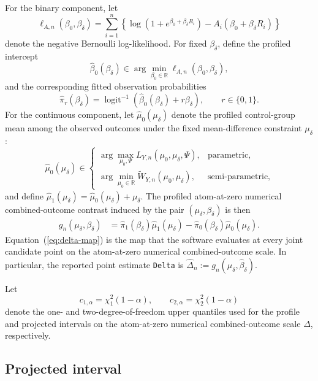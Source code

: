 \documentclass[11pt]{article}
\begin{document}
For the binary component, let
\[
  \ell_{A,n}(\beta_0,\beta_\delta)
  =
  \sum_{i = 1}^n
  \left\{
    \log\left(1 + e^{\beta_0 + \beta_\delta R_i}\right)
    - A_i(\beta_0 + \beta_\delta R_i)
  \right\}
\]
denote the negative Bernoulli log-likelihood. For fixed $\beta_\delta$, define the profiled intercept
\[
  \widehat{\beta}_0(\beta_\delta)
  \in
  \arg\min_{\beta_0 \in \mathbb{R}} \ell_{A,n}(\beta_0,\beta_\delta),
\]
and the corresponding fitted observation probabilities
\[
  \widehat{\pi}_r(\beta_\delta)
  =
  \operatorname{logit}^{-1}\!\left(\widehat{\beta}_0(\beta_\delta) + r\beta_\delta\right),
  \qquad r \in \{0,1\}.
\]
For the continuous component, let $\widehat{\mu}_0(\mu_\delta)$ denote the profiled control-group mean among the observed outcomes under the fixed mean-difference constraint $\mu_\delta$:
\[
  \widehat{\mu}_0(\mu_\delta)
  \in
  \begin{cases}
    \arg\max\limits_{\mu_0,\Psi} L_{Y,n}(\mu_0,\mu_\delta,\Psi), & \text{parametric},\\[0.8em]
    \arg\min\limits_{\mu_0 \in \mathbb{R}} \widetilde{W}_{Y,n}(\mu_0,\mu_\delta), & \text{semi-parametric},
  \end{cases}
\]
and define $\widehat{\mu}_1(\mu_\delta) = \widehat{\mu}_0(\mu_\delta) + \mu_\delta$. The profiled atom-at-zero numerical combined-outcome contrast induced by the pair $(\mu_\delta,\beta_\delta)$ is then
\begin{align}
  g_n(\mu_\delta,\beta_\delta)
  &=
  \widehat{\pi}_1(\beta_\delta)\widehat{\mu}_1(\mu_\delta)
  -
  \widehat{\pi}_0(\beta_\delta)\widehat{\mu}_0(\mu_\delta).
  \label{eq:delta-map}
\end{align}
Equation~(\ref{eq:delta-map}) is the map that the software evaluates at every joint candidate point on the atom-at-zero numerical combined-outcome scale. In particular, the reported point estimate \texttt{Delta} is $\widehat{\Delta}_n := g_n(\widehat{\mu}_\delta,\widehat{\beta}_\delta)$.

Let
\[
  c_{1,\alpha} = \chi^2_1(1-\alpha),
  \qquad
  c_{2,\alpha} = \chi^2_2(1-\alpha)
\]
denote the one- and two-degree-of-freedom upper quantiles used for the profile and projected intervals on the atom-at-zero numerical combined-outcome scale $\Delta$, respectively.

\subsection*{Projected interval}
\end{document}
